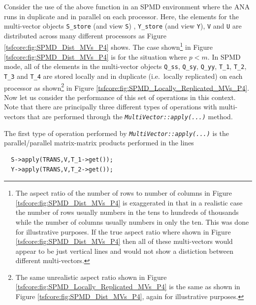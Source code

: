 Consider the use of the above function in an SPMD environment where
the ANA runs in duplicate and in parallel on each processor.  Here,
the elements for the multi-vector objects {}\texttt{S\_store} (and
view {}\texttt{S}) , {}\texttt{Y\_store} (and view {}\texttt{Y}),
{}\texttt{V} and {}\texttt{U} are distributed across many different
processors as Figure {}\ref{tsfcore:fig:SPMD_Dist_MVs_P4} shows.  The
case shown\footnote{The aspect ratio of the number of rows to number
of columns in Figure {}\ref{tsfcore:fig:SPMD_Dist_MVs_P4} is
exaggerated in that in a realistic case the number of rows usually
numbers in the tens to hundreds of thousands while the number of
columns usually numbers in only the ten.  This was done for
illustrative purposes.  If the true aspect ratio where shown in Figure
{}\ref{tsfcore:fig:SPMD_Dist_MVs_P4} then all of these multi-vectors
would appear to be just vertical lines and would not show a distiction
between different multi-vectors.} in Figure
{}\ref{tsfcore:fig:SPMD_Dist_MVs_P4} is for the situation where $p <
m$.  In SPMD mode, all of the elements in the multi-vector objects
{}\texttt{Q\_ss}, {}\texttt{Q\_sy}, {}\texttt{Q\_yy}, {}\texttt{T\_1},
{}\texttt{T\_2}, {}\texttt{T\_3} and {}\texttt{T\_4} are stored
locally and in duplicate (i.e.~locally replicated) on each processor
as shown\footnote{The same unrealistic aspect ratio shown in Figure
{}\ref{tsfcore:fig:SPMD_Locally_Replicated_MVs_P4} is the same as
shown in Figure {}\ref{tsfcore:fig:SPMD_Dist_MVs_P4}, again for
illustrative purposes.} in Figure
{}\ref{tsfcore:fig:SPMD_Locally_Replicated_MVs_P4}.  Now let us
consider the performance of this set of operations in this context.
Note that there are principally three different types of operations
with multi-vectors that are performed through the
{}\texttt{\textit{Multi\-Vector\-::apply(\-...)}} method.

The first type of operation performed by
{}\texttt{\textit{Multi\-Vector\-::apply(\-...)}} is the
parallel/parallel matrix-matrix products performed in the lines

{\scriptsize\begin{verbatim}
  S->apply(TRANS,V,T_1->get());
  Y->apply(TRANS,V,T_2->get());
\end{verbatim}}

